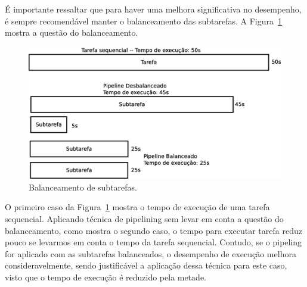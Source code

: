 É importante ressaltar que para haver uma melhora significativa no desempenho, é
sempre recomendável manter o balanceamento das subtarefas. A
Figura~\ref{fig:bal} mostra a questão do balanceamento.

\begin{figure}[!h]
	\centering
	\includegraphics[width=0.95\linewidth]{figs/pipe}
	\caption{Balanceamento de subtarefas.}
	\label{fig:bal}
\end{figure}

O primeiro caso da Figura~\ref{fig:bal} mostra o tempo de execução de uma tarefa
sequencial. Aplicando técnica de pipelining sem levar em conta a questão do
balanceamento, como mostra o segundo caso, o tempo para executar tarefa reduz
pouco se levarmos em conta o tempo da tarefa sequencial. Contudo, se o pipeling
for aplicado com as subtarefas balanceados, o desempenho de execução melhora
consideravelmente, sendo justificável a aplicação dessa técnica para este caso,
visto que o tempo de execução é reduzido pela metade.
